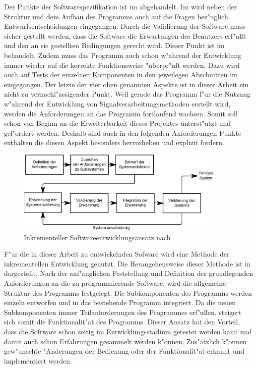 Der Punkte der Softwarespezifikation ist im  abgehandelt.
Im  wird neben der Struktur und dem Aufbau des Programms auch auf die Fragen bez"uglich Entwurfsentscheidungen eingegangen.
Durch die Validierung der Software muss sicher gestellt werden, dass die Software die Erwartungen des Benutzers erf"ullt und den an sie gestellten Bedingungen gerecht wird.
Dieser Punkt ist im  behandelt.
Zudem muss das Programm auch schon w"ahrend der Entwicklung immer wieder auf die korrekte Funktionsweise "uberpr"uft werden.
Dazu wird auch auf Tests der einzelnen Komponenten in den jeweilegen Abschnitten im  eingegangen.
Der letzte der vier oben genannten Aspekte ist in dieser Arbeit ein nicht zu vernachl"assigender Punkt.
Weil gerade das Programm f"ur die Nutzung w"ahrend der Entwicklung von Signalverarbeitungsmethoden erstellt wird, werden die Anforderungen an das Programm fortlaufend wachsen.
Somit soll schon von Beginn an die Erweiterbarkeit dieses Projektes unterst"utzt und gef"ordert werden.
Deshalb sind auch in den folgenden Anforderungen Punkte enthalten die diesen Aspekt besonders hervorheben und explizit fordern.

\begin{figure}[htb]
\centering
\includegraphics[width=0.9\textwidth]{bilder/inkrementelle_entwicklung.eps}
\caption{Inkrementeller Softwareentwicklungsansatz nach \cite{Sommerville2001a}}
\label{pic:inkrementelle_entwicklung}
\end{figure}
F"ur die in dieser Arbeit zu entwickelnden Sofware wird eine Methode der inkrementellen Entwicklung genutzt.
Die Herangehensweise dieser Methode ist in  dargestellt.
Nach der anf"anglichen Feststellung und Definition der grundlegenden Anforderungen an die zu programmierende Software, wird die allgemeine Struktur des Programms festgelegt.
Die Subkomponenten des Programms werden einzeln entworfen und in das bestehende Programm integriert.
Da die neuen Subkomponenten immer Teilanforderungen des Programmes erf"ullen, steigert sich somit die Funktionalit"at des Programms.
Dieser Ansatz hat den Vorteil, dass die Software schon zeitig im Entwicklungsstadium getestet werden kann und damit auch schon Erfahrungen gesammelt werden k"onnen.
Zus"atzlich k"onnen gew"unschte "Anderungen der Bedienung oder der Funktionalit"at erkannt und implementiert werden.


